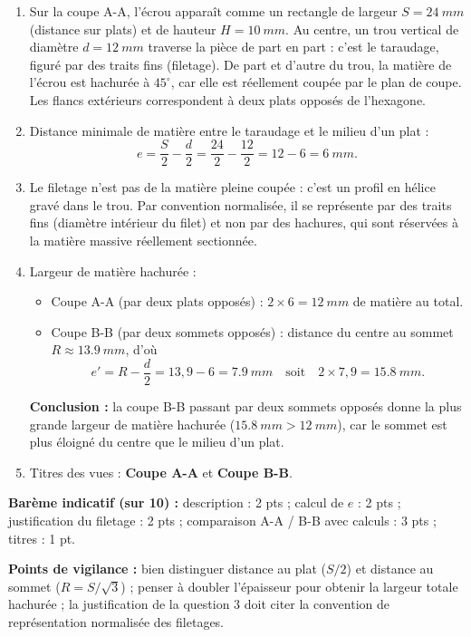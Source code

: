 \documentclass[11pt]{article}
\begin{document}
\begin{corrige}
\begin{enumerate}
\item Sur la coupe A-A, l'écrou apparaît comme un rectangle de largeur $S = \SI{24}{mm}$ (distance sur plats) et de hauteur $H = \SI{10}{mm}$. Au centre, un trou vertical de diamètre $d = \SI{12}{mm}$ traverse la pièce de part en part : c'est le taraudage, figuré par des traits fins (filetage). De part et d'autre du trou, la matière de l'écrou est hachurée à $45^{\circ}$, car elle est réellement coupée par le plan de coupe. Les flancs extérieurs correspondent à deux plats opposés de l'hexagone.
\item Distance minimale de matière entre le taraudage et le milieu d'un plat :
\[ e = \frac{S}{2} - \frac{d}{2} = \frac{24}{2} - \frac{12}{2} = 12 - 6 = \SI{6}{mm}. \]
\item Le filetage n'est pas de la matière pleine coupée : c'est un profil en hélice gravé dans le trou. Par convention normalisée, il se représente par des traits fins (diamètre intérieur du filet) et non par des hachures, qui sont réservées à la matière massive réellement sectionnée.
\item Largeur de matière hachurée :
\begin{itemize}
\item Coupe A-A (par deux plats opposés) : $2 \times 6 = \SI{12}{mm}$ de matière au total.
\item Coupe B-B (par deux sommets opposés) : distance du centre au sommet $R \approx \SI{13,9}{mm}$, d'où
\[ e' = R - \frac{d}{2} = 13,9 - 6 = \SI{7,9}{mm} \quad\text{soit}\quad 2 \times 7,9 = \SI{15,8}{mm}. \]
\end{itemize}
\textbf{Conclusion :} la coupe B-B passant par deux sommets opposés donne la plus grande largeur de matière hachurée ($\SI{15,8}{mm} > \SI{12}{mm}$), car le sommet est plus éloigné du centre que le milieu d'un plat.
\item Titres des vues : \textbf{Coupe A-A} et \textbf{Coupe B-B}.
\end{enumerate}
\textbf{Barème indicatif (sur 10) :} description : 2 pts ; calcul de $e$ : 2 pts ; justification du filetage : 2 pts ; comparaison A-A / B-B avec calculs : 3 pts ; titres : 1 pt.

\textbf{Points de vigilance :} bien distinguer distance au plat ($S/2$) et distance au sommet ($R = S/\sqrt{3}$) ; penser à doubler l'épaisseur pour obtenir la largeur totale hachurée ; la justification de la question 3 doit citer la convention de représentation normalisée des filetages.
\end{corrige}
\end{document}
